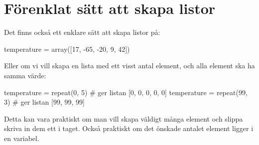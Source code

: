 \section{Förenklat sätt att skapa listor}
Det finns också ett enklare sätt att skapa listor på:

\begin{python}[caption={Förenklat sätt att skapa listor},label={}]
temperature = array([17, -65, -20, 9, 42])
\end{python}

Eller om vi vill skapa en lista med ett visst antal element, och alla element ska ha samma värde:

\begin{python}[caption={Massproduktion},label={}]
temperature = repeat(0, 5) # ger listan [0, 0, 0, 0, 0]
temperature = repeat(99, 3) # ger listan [99, 99, 99]
\end{python}

Detta kan vara praktiskt om man vill skapa väldigt många element och slippa skriva in dem ett i taget. Också praktiskt om det önskade antalet element ligger i en variabel.










